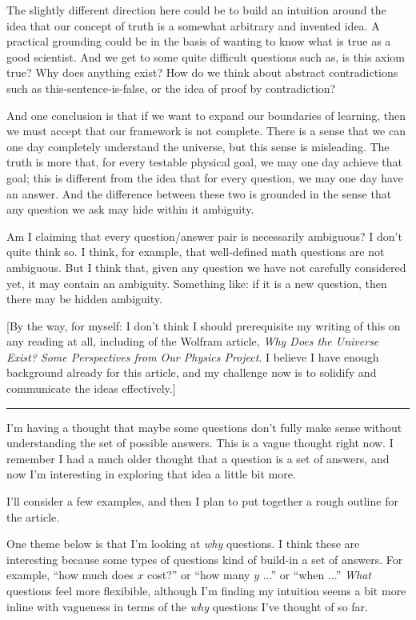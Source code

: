 \documentclass[11pt, oneside]{article}   	%
\begin{document}
The slightly different direction here could be to build an intuition around the
idea that our concept of truth is a somewhat arbitrary and invented idea. A
practical grounding could be in the basis of wanting to know what is true as a
good scientist. And we get to some quite difficult questions such as, is this
axiom true? Why does anything exist? How do we think about abstract
contradictions such as this-sentence-is-false, or the idea of proof by
contradiction?

And one conclusion is that if we want to expand our boundaries of learning, then
we must accept that our framework is not complete. There is a sense that we can
one day completely understand the universe, but this sense is misleading. The
truth is more that, for every testable physical goal, we may one day achieve
that goal; this is different from the idea that for every question, we may one
day have an answer. And the difference between these two is grounded in the
sense that any question we ask may hide within it ambiguity.

Am I claiming that every question/answer pair is necessarily ambiguous? I don't
quite think so. I think, for example, that well-defined math questions are not
ambiguous. But I think that, given any question we have not carefully considered
yet, it may contain an ambiguity. Something like: if it is a new question, then
there may be hidden ambiguity.

[By the way, for myself: I don't think I should prerequisite my writing of this
on any reading at all, including of the Wolfram article, {\em Why Does the
Universe Exist? Some Perspectives from Our Physics Project}. I believe I have
enough background already for this article, and my challenge now is to solidify
and communicate the ideas effectively.]

\bigskip
\hrule
\bigskip

I'm having a thought that maybe some questions don't fully make sense without
understanding the set of possible answers. This is a vague thought right now. I
remember I had a much older thought that a question is a set of answers, and now
I'm interesting in exploring that idea a little bit more.

I'll consider a few examples, and then I plan to put together a rough outline
for the article.

One theme below is that I'm looking at {\em why} questions. I think these are
interesting because some types of questions kind of build-in a set of answers.
For example, ``how much does $x$ cost?'' or ``how many $y$ ...'' or ``when ...''
{\em What} questions feel more flexibible, although I'm finding my intuition
seems a bit more inline with vagueness in terms of the {\em why} questions I've
thought of so far.
\end{document}
